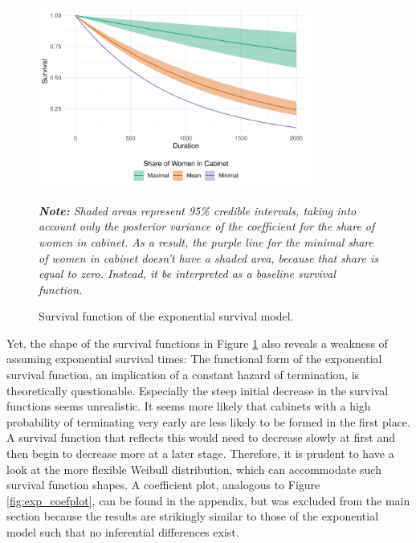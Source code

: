 \documentclass[11pt]{article}
\newcommand\fnote[1]{\captionsetup{font=footnotesize}\caption*{\textit{#1}}}
\newcommand\minp[1]{\begin{minipage}{0.8\textwidth} #1 \end{minipage}}
\begin{document}
\begin{figure}[!ht]
    \centering
    \minp{\caption{Survival function of the exponential survival model.} \label{fig:exp_survplot}}
    \includegraphics[width = 0.8\textwidth]{figures/fig4_exp_survplot.pdf}
    \minp{\fnote{\textbf{Note:} Shaded areas represent 95\% credible intervals, taking into account only the posterior variance of the coefficient for the share of women in cabinet. As a result, the purple line for the minimal share of women in cabinet doesn't have a shaded area, because that share is equal to zero. Instead, it be interpreted as a baseline survival function.}}
\end{figure}

Yet, the shape of the survival functions in Figure \ref{fig:exp_survplot} also reveals a weakness of assuming exponential survival times: The functional form of the exponential survival function, an implication of a constant hazard of termination, is theoretically questionable. Especially the steep initial decrease in the survival functions seems unrealistic. It seems more likely that cabinets with a high probability of terminating very early are less likely to be formed in the first place. A survival function that reflects this would need to decrease slowly at first and then begin to decrease more at a later stage. Therefore, it is prudent to have a look at the more flexible Weibull distribution, which can accommodate such survival function shapes. A coefficient plot, analogous to Figure \ref{fig:exp_coefplot}, can be found in the appendix, but was excluded from the main section because the results are strikingly similar to those of the exponential model such that no inferential differences exist.
\end{document}
